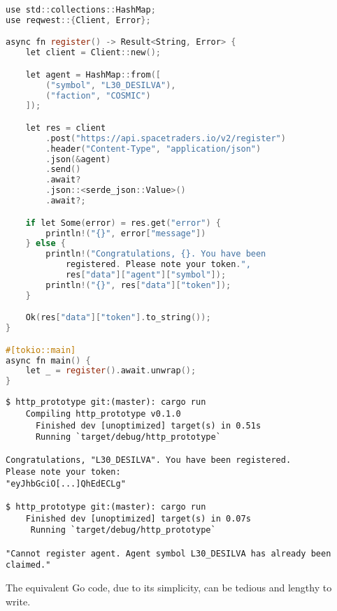 \begin{lstlisting}[language=C]
use std::collections::HashMap;
use reqwest::{Client, Error};

async fn register() -> Result<String, Error> {
    let client = Client::new();

    let agent = HashMap::from([
        ("symbol", "L30_DESILVA"), 
        ("faction", "COSMIC")
    ]);

    let res = client
        .post("https://api.spacetraders.io/v2/register")
        .header("Content-Type", "application/json")
        .json(&agent)
        .send()
        .await?
        .json::<serde_json::Value>()
        .await?;

    if let Some(error) = res.get("error") {
        println!("{}", error["message"])
    } else {
        println!("Congratulations, {}. You have been 
            registered. Please note your token.", 
            res["data"]["agent"]["symbol"]);
        println!("{}", res["data"]["token"]);
    }

    Ok(res["data"]["token"].to_string());
}

#[tokio::main]
async fn main() {
    let _ = register().await.unwrap();
}

\end{lstlisting}

\begin{lstlisting}
$ http_prototype git:(master): cargo run
    Compiling http_prototype v0.1.0 
      Finished dev [unoptimized] target(s) in 0.51s
      Running `target/debug/http_prototype`

Congratulations, "L30_DESILVA". You have been registered.
Please note your token:
"eyJhbGciO[...]QhEdECLg"

$ http_prototype git:(master): cargo run
    Finished dev [unoptimized] target(s) in 0.07s
     Running `target/debug/http_prototype`

"Cannot register agent. Agent symbol L30_DESILVA has already been claimed." 

\end{lstlisting}

The equivalent Go code, due to its simplicity, can be tedious and lengthy to write. 

